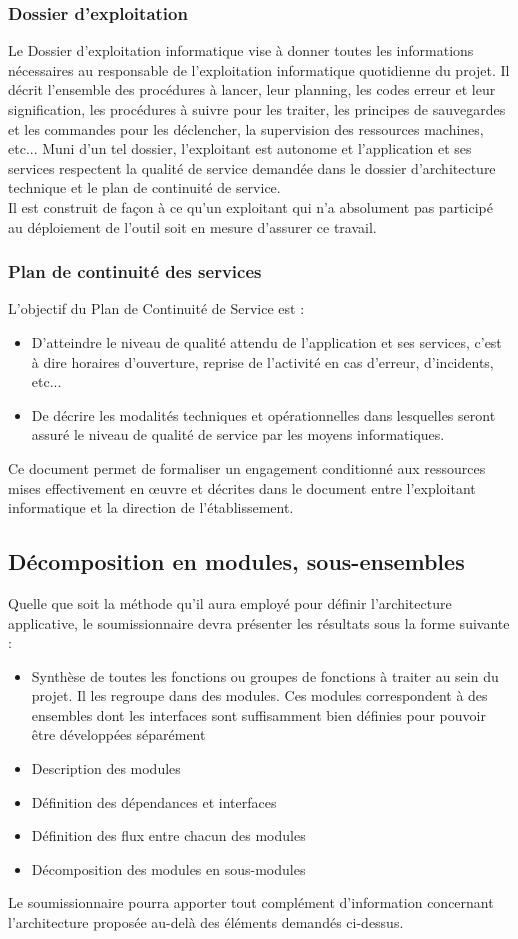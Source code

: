 \subsubsection{Dossier d'exploitation}
Le Dossier d'exploitation informatique vise à donner toutes les informations nécessaires au responsable de l'exploitation informatique quotidienne du projet. Il décrit l'ensemble des procédures à lancer, leur planning, les codes erreur et leur signification, les procédures à suivre pour les traiter, les principes de sauvegardes et les commandes pour les déclencher, la supervision des ressources machines, etc... Muni d'un tel dossier, l'exploitant est autonome et l'application et ses services respectent la qualité de service demandée dans le dossier d'architecture technique et le plan de continuité de service.
\\
Il est construit de façon à ce qu'un exploitant qui n'a absolument pas participé au déploiement de l'outil soit en mesure d'assurer ce travail.

\subsubsection{Plan de continuité des services}
L'objectif du Plan de Continuité de Service est :
\begin{itemize}
 \item D'atteindre le niveau de qualité attendu de l'application et ses services, c'est à dire horaires d'ouverture, reprise de l'activité en cas d'erreur, d'incidents, etc...
 \item De décrire les modalités techniques et opérationnelles dans lesquelles seront assuré le niveau de qualité de service par les moyens informatiques.
\end{itemize}
Ce document permet de formaliser un engagement conditionné aux ressources mises effectivement en œuvre et décrites dans le document entre l'exploitant informatique et la direction de l'établissement.

\subsection{Décomposition en modules, sous-ensembles}
Quelle que soit la méthode qu'il aura employé pour définir l'architecture applicative, le soumissionnaire devra présenter les résultats sous la forme suivante :
\begin{itemize}
 \item Synthèse de toutes les fonctions ou groupes de fonctions à traiter au sein du projet. Il les regroupe dans des modules. Ces modules correspondent à des ensembles dont les interfaces sont suffisamment bien définies pour pouvoir être développées séparément
 \item Description des modules
 \item Définition des dépendances et interfaces
 \item Définition des flux entre chacun des modules
 \item Décomposition des modules en sous-modules
\end{itemize}
Le soumissionnaire pourra apporter tout complément d'information concernant l'architecture proposée au-delà des éléments demandés ci-dessus. 

